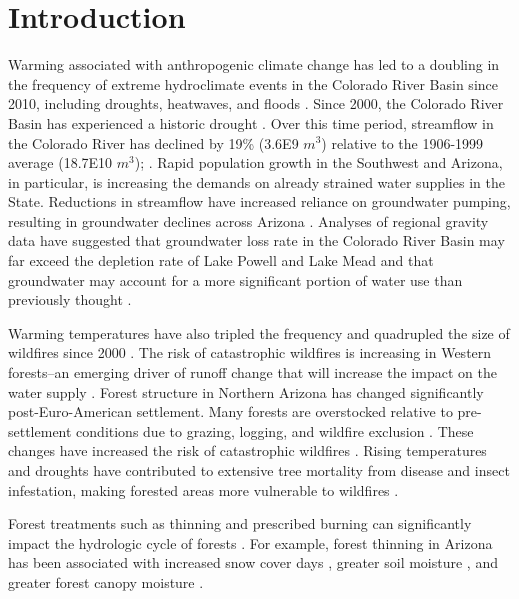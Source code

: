 \documentclass[
  number,
  preprint,
  3p,
  onecolumn]{elsarticle}
\begin{document}
\section{Introduction}\label{introduction}

Warming associated with anthropogenic climate change has led to a
doubling in the frequency of extreme hydroclimate events in the Colorado
River Basin since 2010, including droughts, heatwaves, and floods
\citep{bennett_concurrent_2021}. Since 2000, the Colorado River Basin
has experienced a historic drought
\citep{meko_treering_2022, williams_rapid_2022}. Over this time period,
streamflow in the Colorado River has declined by 19\% (3.6E9 \(m^3\))
relative to the 1906-1999 average (18.7E10 \(m^3\));
\citep{hogan_recent_2024, udall_twentyfirst_2017}. Rapid population
growth in the Southwest and Arizona, in particular, is increasing the
demands on already strained water supplies in the State. Reductions in
streamflow have increased reliance on groundwater pumping, resulting in
groundwater declines across Arizona \citep{tadych_historical_2024}.
Analyses of regional gravity data have suggested that groundwater loss
rate in the Colorado River Basin may far exceed the depletion rate of
Lake Powell and Lake Mead and that groundwater may account for a more
significant portion of water use than previously thought
\citep{castle2014}.

Warming temperatures have also tripled the frequency and quadrupled the
size of wildfires since 2000 \citep{iglesias2022}. The risk of
catastrophic wildfires is increasing in Western forests--an emerging
driver of runoff change that will increase the impact on the water
supply \citep{williams_rapid_2022}. Forest structure in Northern Arizona
has changed significantly post-Euro-American settlement. Many forests
are overstocked relative to pre-settlement conditions due to grazing,
logging, and wildfire exclusion
\citep{covington_southwestern_1994, friederici2013}. These changes have
increased the risk of catastrophic wildfires \citep{allen2002}. Rising
temperatures and droughts have contributed to extensive tree mortality
from disease and insect infestation, making forested areas more
vulnerable to wildfires \citep{berner_tree_2017}.

Forest treatments such as thinning and prescribed burning can
significantly impact the hydrologic cycle of forests
\citep{del_campo_global_2022}. For example, forest thinning in Arizona
has been associated with increased snow cover days
\citep{sankey_multi-scale_2015, belmonte2021, donager_integrating_2021},
greater soil moisture \citep{belmonte_soil_2022, sankey_thinning_2022},
and greater forest canopy moisture \citep{sankey_regionalscale_2021}.
\end{document}

